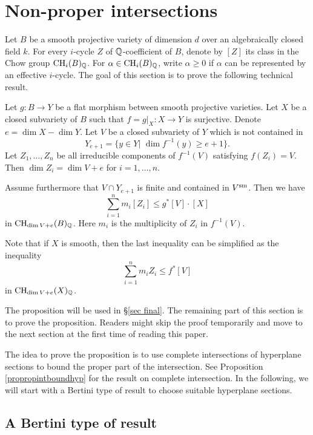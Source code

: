 \documentclass[12pt]{amsart}
\begin{document}
\section{Non-proper intersections} \label{sec nonproper}

Let $B$ be a smooth projective variety of dimension $d$ over an algebraically closed field $k$.
For every $i$-cycle $Z$ of ${\mathbb Q}$-coefficient of $B$,  denote by $[Z]$ its class in the Chow group
${\rm CH}_i(B)_{{\mathbb Q}}$. For $\alpha\in {\rm CH}_i(B)_{{\mathbb Q}}$, write $\alpha\geq 0$ if $\alpha$ can be represented by an effective $i$-cycle.
The goal of this section is to prove the following technical result. 

\begin{pro}\label{prostrleqtot}
Let $g: B\to Y$ be a flat morphism between smooth projective varieties.
Let $X$ be a closed subvariety of $B$ such that $f=g|_X: X\to Y$ is surjective. 
Denote $e=\dim X-\dim Y$. 
Let $V$ be a closed subvariety of $Y$ which is not contained in 
$$Y_{e+1}=\{y\in Y|\,\, \dim f^{-1}(y)\geq e+1\}.$$ 
Let $Z_1, \dots, Z_n$ be all irreducible components of $f^{-1}(V)$ satisfying 
$f(Z_i)=V.$ Then $\dim Z_i=\dim V+e$ for $i=1,\dots,n$. 

Assume furthermore that $V\cap Y_{e+1}$ is finite and contained in $V^{{\rm sm}}$.
Then we have 
$$\sum_{i=1}^n m_i[Z_i]\leq g^*[V]\cdot [X]$$
in ${\rm CH}_{\dim V+e}(B)_{\mathbb Q}$. 
Here $m_i$ is the multiplicity of $Z_i$ in $f^{-1}(V).$ 
\end{pro}

Note that if $X$ is smooth, then the last inequality can be simplified as the inequality 
$$\sum_{i=1}^n m_iZ_i\leq f^*[V]$$
in ${\rm CH}_{\dim V+e}(X)_{\mathbb Q}$. 

The proposition will be used in \S\ref{sec final}. 
The remaining part of this section is to prove the proposition. 
Readers might skip the proof temporarily and move to the next section at the first time of reading this paper.

The idea to prove the proposition is to use complete intersections of hyperplane sections to bound the proper part of the intersection. See Proposition \ref{propropintboundhyp} for the result on complete intersection. 
In the following, we will start with a Bertini type of result to choose suitable hyperplane sections. 


\subsection{A Bertini type of result}
\end{document}
